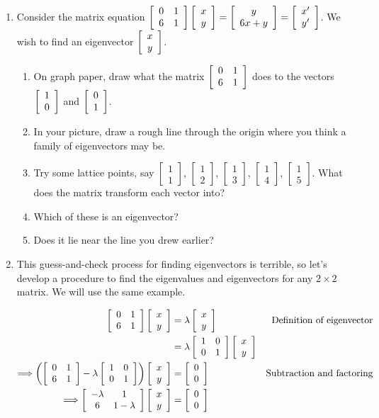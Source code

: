 \documentclass[../gatm.tex]{subfiles}
\begin{document}
\begin{enumerate}
\item Consider the matrix equation $\left[\begin{array}{cc} 0 & 1 \\ 6 & 1 \end{array}\right]\left[\begin{array}{c} x \\ y \end{array}\right] = \left[\begin{array}{c} y \\ 6x+y \end{array}\right]=\left[\begin{array}{c} x' \\ y' \end{array}\right]$. We wish to find an eigenvector $\left[\begin{array}{c} x \\ y \end{array}\right]$.
\begin{enumerate}
\item On graph paper, draw what the matrix $\left[\begin{array}{cc} 0 & 1 \\ 6 & 1 \end{array}\right]$ does to the vectors $\left[\begin{array}{c} 1 \\ 0 \end{array}\right]$ and $\left[\begin{array}{c} 0 \\ 1 \end{array}\right]$.
\item In your picture, draw a rough line through the origin where you think a family of eigenvectors may be.
\item Try some lattice points, say $\left[\begin{array}{c} 1 \\ 1 \end{array}\right]$, $\left[\begin{array}{c} 1 \\ 2 \end{array}\right]$, $\left[\begin{array}{c} 1 \\ 3 \end{array}\right]$, $\left[\begin{array}{c} 1 \\ 4 \end{array}\right]$, $\left[\begin{array}{c} 1 \\ 5 \end{array}\right]$. What does the matrix transform each vector into?
\item Which of these is an eigenvector?
\item Does it lie near the line you drew earlier?
\end{enumerate}
\item This guess-and-check process for finding eigenvectors is terrible, so let's develop a procedure to find the eigenvalues and eigenvectors for any $2\times 2$ matrix. We will use the same example.

\begin{align*}
\left[\begin{array}{cc} 0 & 1 \\ 6 & 1 \end{array}\right]\left[\begin{array}{c} x \\ y \end{array}\right] &= \lambda\left[\begin{array}{c} x \\ y \end{array}\right] & \text{Definition of eigenvector} \\
&= \lambda\left[\begin{array}{cc} 1 & 0 \\ 0 & 1 \end{array}\right]\left[\begin{array}{c} x \\ y \end{array}\right] \\
\Longrightarrow \left(\left[\begin{array}{cc} 0 & 1 \\ 6 & 1 \end{array}\right]-\lambda\left[\begin{array}{cc} 1 & 0 \\ 0 & 1 \end{array}\right]\right)\left[\begin{array}{c} x \\ y \end{array}\right]&=\left[\begin{array}{c} 0 \\ 0 \end{array}\right] & \text{Subtraction and factoring} \\
\Longrightarrow \left[\begin{array}{cc} -\lambda & 1 \\ 6 & 1-\lambda \end{array}\right]\left[\begin{array}{c} x \\ y \end{array}\right] &= \left[\begin{array}{c} 0 \\ 0 \end{array}\right]
\end{align*}


\end{enumerate}
\end{document}
